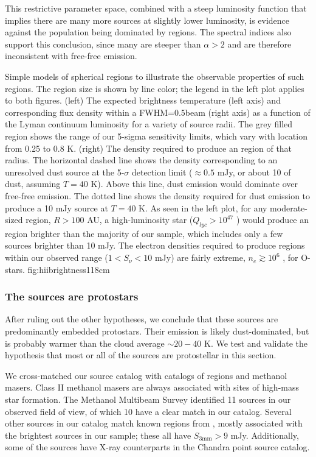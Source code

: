 \documentclass[twocolumn]{aastex61}
\begin{document}
This restrictive parameter space, combined with a steep luminosity function
that implies there are many more sources at slightly lower luminosity, is
evidence against the population being dominated by \hii regions.  The spectral
indices also support this conclusion, since many are steeper than $\alpha>2$
and are therefore inconsistent with free-free emission.



{Simple models of spherical \hii regions to illustrate the observable
properties of such regions.  The \hii region size is shown by line color; the legend
in the left plot applies to both figures.  (left) The expected brightness temperature (left
axis) and corresponding flux density within a FWHM=0.5\arcsec beam (right axis) as a
function of the Lyman continuum luminosity for a variety of source radii.
The grey filled region shows the range of our 5-sigma sensitivity limits,
which vary with location from 0.25 to 0.8 K.
(right) The density required to produce an \hii region of that radius.  The
horizontal dashed line shows the density corresponding to an unresolved dust
source at the 5-$\sigma$ detection limit ($\approx0.5$ mJy, or about 10 \msun
of dust,
assuming $T=40$ K).  Above this line, dust emission would dominate over
free-free emission.  The dotted line shows the density required for dust
emission to produce a 10 mJy source at $T=40$ K.  
As seen in the left plot, for any moderate-sized \hii region, $R>100$ AU, a high-luminosity
star ($Q_{lyc} > 10^{47}$ \pers) would produce an \hii region brighter than the
majority of our sample, which includes only a few sources brighter than 10 mJy.
The electron densities required to produce \hii regions within our observed range
($1<S_\nu<10$ mJy) are fairly extreme, $n_e\gtrsim10^6$ \percc, for O-stars.}
{fig:hiibrightness}{1}{18cm}


\subsubsection{The sources are protostars}
\label{sec:theyareprotostars}
After ruling out the other hypotheses, we conclude that these sources are
predominantly embedded protostars.  Their emission is likely dust-dominated,
but is probably warmer than the cloud average $\sim20-40$ K.
We test and validate the hypothesis that most or all of the sources
are protostellar in this section.

We cross-matched our source catalog with catalogs of \hii regions and 
methanol masers.  Class II methanol masers are always associated
with sites of high-mass star formation.
The \citet{Caswell2010a} Methanol Multibeam Survey identified 11 sources in our
observed field of view, of which 10 have a clear match in our catalog.
Several other sources in our catalog match known \hii regions from
\citet{Gaume1995a}, mostly associated with the brightest sources in our sample;
these all have $S_{3 \textrm{mm}} > 9$ mJy.  Additionally, some of the
sources have X-ray counterparts in the \citet{Muno2009a} Chandra point source
catalog.
\end{document}
